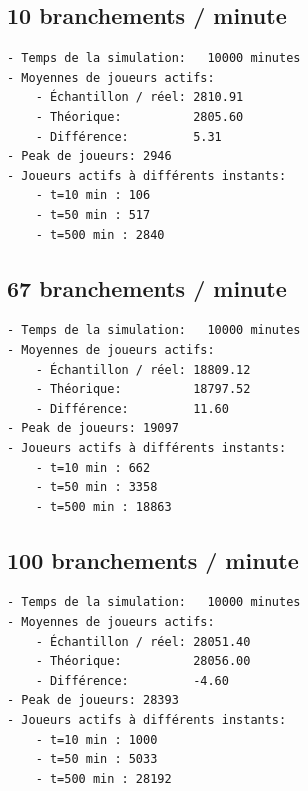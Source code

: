 \documentclass[11pt]{article}
\newcommand{\prompt}[4]{
        {\ttfamily\llap{{\color{#2}[#3]:\hspace{3pt}#4}}\vspace{-\baselineskip}}
    }
\begin{document}
            
\prompt{Out}{outcolor}{15}{}
    
    \subsection{10 branchements / minute}\label{branchements-minute}

\begin{verbatim}
- Temps de la simulation:   10000 minutes
- Moyennes de joueurs actifs:
    - Échantillon / réel: 2810.91
    - Théorique:          2805.60
    - Différence:         5.31
- Peak de joueurs: 2946
- Joueurs actifs à différents instants:
    - t=10 min : 106
    - t=50 min : 517
    - t=500 min : 2840
\end{verbatim}

\subsection{67 branchements / minute}\label{branchements-minute-1}

\begin{verbatim}
- Temps de la simulation:   10000 minutes
- Moyennes de joueurs actifs:
    - Échantillon / réel: 18809.12
    - Théorique:          18797.52
    - Différence:         11.60
- Peak de joueurs: 19097
- Joueurs actifs à différents instants:
    - t=10 min : 662
    - t=50 min : 3358
    - t=500 min : 18863
\end{verbatim}

\subsection{100 branchements / minute}\label{branchements-minute-2}

\begin{verbatim}
- Temps de la simulation:   10000 minutes
- Moyennes de joueurs actifs:
    - Échantillon / réel: 28051.40
    - Théorique:          28056.00
    - Différence:         -4.60
- Peak de joueurs: 28393
- Joueurs actifs à différents instants:
    - t=10 min : 1000
    - t=50 min : 5033
    - t=500 min : 28192
\end{verbatim}

    
\end{document}
